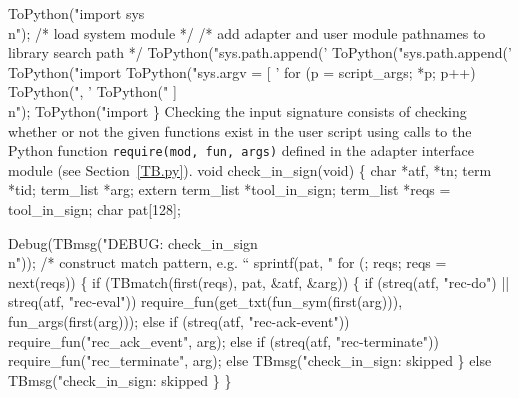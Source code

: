   ToPython("import sys\\n");                     /* load system module */
            /* add adapter and user module pathnames to library search path */
  ToPython("sys.path.append('%
  ToPython("sys.path.append('%
  ToPython("import %
  ToPython("sys.argv = [ '%
  for (p = script_args; *p; p++) 
    ToPython(", '%
  ToPython(" ]\\n");
  ToPython("import %
\}
\nwendcode{}\nwdocspar
Checking the input signature consists of checking whether or not the
given functions exist in the user script using calls to the Python
function \texttt{require(mod, fun, args)} defined in the adapter
interface module (see Section~\ref{TB.py}).
\nwenddocs{}\plusendmoddef\nwstartdeflinemarkup{}\nwenddeflinemarkup
void check_in_sign(void) \{ 
  char *atf, *tn;
  term *tid;
  term_list *arg;
  extern term_list *tool_in_sign;
  term_list *reqs = tool_in_sign;
  char pat[128];

  Debug(TBmsg("DEBUG: check_in_sign\\n"));
                /* construct match pattern, e.g. ``%
  sprintf(pat, "%
  for (; reqs; reqs = next(reqs)) \{
    if (TBmatch(first(reqs), pat, &atf, &arg)) \{
      if (streq(atf, "rec-do") || streq(atf, "rec-eval"))
        require_fun(get_txt(fun_sym(first(arg))), fun_args(first(arg)));
      else if (streq(atf, "rec-ack-event"))
        require_fun("rec_ack_event", arg);
      else if (streq(atf, "rec-terminate"))
        require_fun("rec_terminate", arg);
      else
        TBmsg("check_in_sign: skipped %
    \} else
      TBmsg("check_in_sign: skipped %
  \}
\}

